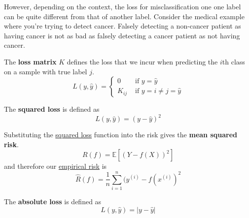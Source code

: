   However, depending on the context, the loss for misclassification one one label can be quite different from that of another label. Consider the medical example where you're trying to detect cancer. Falsely detecting a non-cancer patient as having cancer is not as bad as falsely detecting a cancer patient as not having cancer. 

  \begin{definition}
    \label{def:weighted-misclassification-loss}
    The \textbf{loss matrix} $K$ defines the loss that we incur when predicting the $i$th class on a sample with true label $j$. 
    \begin{equation}
      L(y, \hat{y}) = \begin{cases} 0 & \text{ if } y = \hat{y} \\ K_{ij} & \text{ if } y = i \neq j = \hat{y} \end{cases}
    \end{equation}
  \end{definition}

  \begin{definition}
    \label{def:squared-loss}
    The \textbf{squared loss} is defined as 
    \begin{equation}
      L(y, \hat{y}) = (y - \hat{y})^2
    \end{equation}
  \end{definition}

  \begin{example}
    \label{ex:mean-squared-risk}
    Substituting the \hyperref[def:squared-loss]{squared loss} function into the risk gives the \textbf{mean squared risk}. 
    \begin{equation}
      R(f) = \mathbb{E}[(Y - f(X))^2]
    \end{equation}
    and therefore our \hyperref[def:empirical-risk]{empirical risk} is 
    \begin{equation}
      \hat{R} (f) = \frac{1}{n} \sum_{i=1}^n (y^{(i)} - f(x^{(i)})^2
    \end{equation}
  \end{example}

  \begin{definition}
    \label{def:absolute-loss}
    The \textbf{absolute loss} is defined as 
    \begin{equation}
      L(y, \hat{y}) = |y - \hat{y}|
    \end{equation}
  \end{definition}

